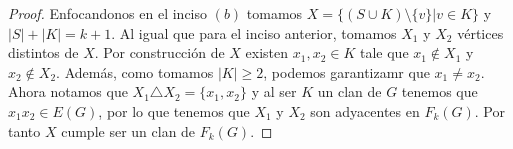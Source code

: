 \begin{proof}
        Enfocandonos en el inciso $(b)$ tomamos $X = \{(S\cup K) \setminus
        \{v\}| v \in K \}$ y $|S| + |K| = k+1$. Al igual que para el inciso
        anterior, tomamos $X_1$ y $X_2$ v\'ertices distintos de $X$. Por
        construcci\'on de $X$ existen $x_1, x_2 \in K$ tale que $x_1 \notin X_1$
        y $x_2 \notin X_2$. Adem\'as, como tomamos $|K| \geq 2$, podemos
        garantizamr que $x_1 \neq x_2$. Ahora notamos que $X_1 \triangle X_2 =
        \{x_1, x_2\}$ y al ser $K$ un clan de $G$ tenemos que $x_1x_2 \in E(G)$,
        por lo que tenemos que $X_1$ y $X_2$ son adyacentes en $F_k(G)$. Por
        tanto $X$ cumple ser un clan de $F_k(G)$.
    \end{proof}
